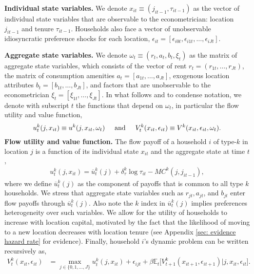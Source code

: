\documentclass[11pt]{article}
\newcommand{\E}{\mathbb{E}}
\newcommand{\spaceand}{\hspace{5mm}\text{and}\hspace{5mm}}
\newcommand{\Paragraph}{\vspace{0.1cm}\noindent\textbf}
\begin{document}
\Paragraph{Individual state variables.}  We denote $x_{it} \equiv  (j_{it-1}, \tau_{it-1})$ as the vector of individual state variables that are observable to the econometrician: location $j_{it-1}$ and tenure $\tau_{it-1}$. Households also face a vector of unobservable idiosyncratic preference shocks for each location, $\epsilon_{it} = [\epsilon_{i0t}, \epsilon_{i1t}, \dots, \epsilon_{iJt}]$.

\Paragraph{Aggregate state variables.} We denote $\omega_t \equiv (r_t,a_t,b_t,\xi_t)$ as the matrix of aggregate state variables, which consists of the vector of rent $r_t= (r_{1t}, \dots, r_{Jt})$, the matrix of consumption amenities $a_t=[a_{1t}, \dots, a_{Jt}]$, exogenous location attributes  $b_t=[b_{1t}, \dots, b_{Jt}]$, and factors that are unobservable to the econometrician $\xi_t=[\xi_{1t}, \dots, \xi_{Jt}]$. In what follows and to condense notation, we denote with subscript $t$ the functions that depend on $\omega_t$, in particular the flow utility and value function,
\begin{align*}
      u^k_t(j, x_{it}) \equiv  u^k(j, x_{it}, \omega_t)  \spaceand  V^k_t(x_{it} , \epsilon_{it}) \equiv  V^k(x_{it}, \epsilon_{it},\omega_t).
\end{align*}
\Paragraph{Flow utility and value function.} The flow payoff of a household $i$ of type-$k$ in location $j$ is a function of its individual state $x_{it}$ and the aggregate state at time $t$,
\begin{align}\label{eq: main_utility_vij}
 u^k_t(j, x_{it}) = \overline{u}^k_t(j)+ \delta_{\tau}^k \log \tau_{it} - MC^k(j,j_{it-1}),
\end{align}
where we define $\overline{u}^k_t(j)$ as the component of payoffs that is common to all type $k$ households. We stress that aggregate state variables such as $r_{jt}, a_{jt}$, and $ b_{jt}$ enter flow payoffs through $\overline{u}^k_t(j)$. Also note the $k$ index in $\overline{u}^k_t(j)$ implies preferences heterogeneity over such variables. We allow for the utility of households to increase with  location capital, motivated by the fact that the likelihood of moving to a new location decreases with location tenure (see Appendix \ref{sec: evidence hazard rate} for evidence). Finally, household $i$'s dynamic problem can be written recursively as,
\begin{align*}
    V^k_t(x_{it} , \epsilon_{it})
    & =\max_{j \in  \{0,1,...,J\}}u^k_t(j, x_{it})+ \epsilon_{ijt} + \beta \E_t\Bigg[ V^k_{t+1}( x_{it+1} , \epsilon_{it+1})| j, x_{it},\epsilon_{it} \Bigg].
\end{align*}
\end{document}
